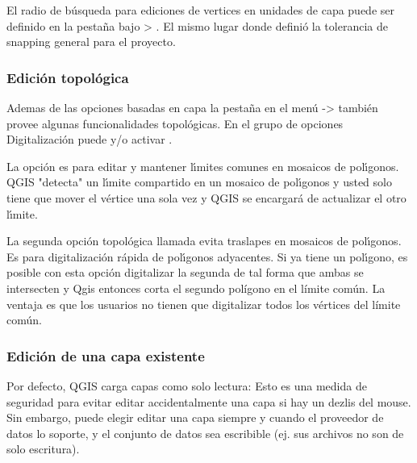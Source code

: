 El radio de b\'usqueda para ediciones de vertices en unidades de capa puede ser definido en la
pesta\~na  bajo  >
. El mismo lugar donde defini\'o la
tolerancia de snapping general para el proyecto.

\subsubsection{Edici\'on topol\'ogica}

Ademas de las opciones basadas en capa la pesta\~na  en el men\'u 
 ->  
también provee algunas funcionalidades topol\'ogicas. 
En el grupo de opciones Digitalizaci\'on puede  y/o activar 
.


La opci\'on  es para editar y mantener 
l\'{\i}mites comunes en mosaicos de pol\'{\i}gonos. QGIS "detecta" un l\'{\i}mite compartido en 
un mosaico de pol\'{\i}gonos y usted solo tiene que mover el v\'ertice una sola vez y QGIS se encargar\'a 
de actualizar el otro l\'{\i}mite.


La segunda opci\'on topol\'ogica llamada  
evita traslapes en mosaicos de pol\'{\i}gonos. Es para digitalizaci\'on r\'apida de pol\'{\i}gonos adyacentes. 
Si ya tiene un pol\'{\i}gono, es posible con esta opci\'on digitalizar la segunda 
de tal forma que ambas se intersecten y Qgis entonces corta el segundo pol\'{i}gono en el l\'{i}mite com\'un. 
La ventaja es que los usuarios no tienen que digitalizar todos los v\'ertices del l\'{i}mite com\'un.

\subsubsection{Edici\'on de una capa existente}
\label{sec:edit_existing_layer}

Por defecto, QGIS carga capas como solo lectura: Esto es una medida de seguridad
para evitar editar accidentalmente una capa si hay un dezlis del mouse.
Sin embargo, puede elegir editar una capa siempre y cuando el proveedor de datos lo soporte,
y el conjunto de datos sea escribible (ej. sus archivos no son de solo escritura).

